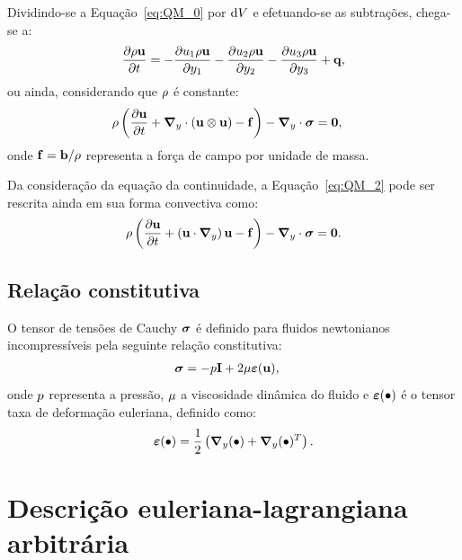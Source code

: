 Dividindo-se a Equação~\eqref{eq:QM_0} por $\mathrm{d} V$ e efetuando-se as subtrações, chega-se a:
\begin{align}
		\frac{\partial \rho \mathbf{u}}{\partial t} = 
		-\frac{\partial u_1 \rho \mathbf{u}}{\partial y_1} 
		-\frac{\partial u_2 \rho \mathbf{u}}{\partial y_2}  
		-\frac{\partial u_3 \rho \mathbf{u}}{\partial y_3} + \mathbf{q},
		\label{eq:QM_1} 
\end{align}
\noindent ou ainda, considerando que $\rho$ é constante:
\begin{align}
	\rho\left(\frac{\partial\mathbf{u}}{\partial t} + \boldsymbol{\nabla}_y \cdot \left(\mathbf{u}\otimes\mathbf{u}\right) - \mathbf{f} \right) - \boldsymbol{\nabla}_y \cdot \boldsymbol{\sigma}  &= \mathbf{0}, \label{eq:QM_2} 
\end{align}
\noindent onde $\mathbf{f} = \mathbf{b}/\rho$ representa a força de campo por unidade de massa.

Da consideração da equação da continuidade, a Equação~\eqref{eq:QM_2} pode ser rescrita ainda em sua forma convectiva como:
\begin{align}
	\rho\left(\frac{\partial\mathbf{u}}{\partial t} + \left( \mathbf{u} \cdot \boldsymbol{\nabla}_y \right)  \mathbf{u}  - \mathbf{f} \right) - \boldsymbol{\nabla}_y \cdot \boldsymbol{\sigma} = \mathbf{0}. \label{eq:Navier-Stokes} 
\end{align}

\subsection{Relação constitutiva}

O tensor de tensões de Cauchy $\boldsymbol{\sigma}$ é definido para fluidos newtonianos incompressíveis pela seguinte relação constitutiva:
\begin{align}
\boldsymbol{\sigma} &= -p \mathbf{I} + 2\mu\bm{\varepsilon}(\mathbf{u}),\label{eq:tensor_tensoes_fluido}
\end{align}
\noindent onde $p$ representa a pressão, $\mu$ a viscosidade dinâmica do fluido e $\bm{\varepsilon}(\bullet)$ é o tensor taxa de deformação euleriana, definido como:
\begin{align}
\bm{\varepsilon}(\bullet) = \frac{1}{2}\left(\boldsymbol{\nabla}_y (\bullet) + \boldsymbol{\nabla}_y (\bullet)^{T}\right). 
\label{eq:tensor_taxa_defor}
\end{align}


\section{Descrição euleriana-lagrangiana arbitrária} \label{capitulo:Cap2:ALE}

